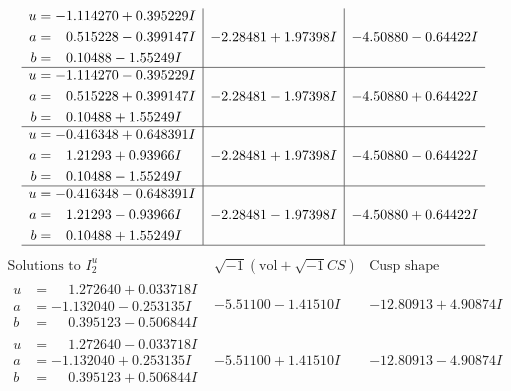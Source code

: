 \documentclass[1p]{elsarticle_modified}
\theoremstyle{definition}
\newcommand{\I}{\sqrt{-1}}
\begin{document}
$$\begin{array}{c|c|c}
\begin{aligned}
u &= -1.114270 + 0.395229 I \\
a &= \phantom{-}0.515228 - 0.399147 I \\
b &= \phantom{-}0.10488 - 1.55249 I\end{aligned}
 & -2.28481 + 1.97398 I & -4.50880 - 0.64422 I \\ \hline\begin{aligned}
u &= -1.114270 - 0.395229 I \\
a &= \phantom{-}0.515228 + 0.399147 I \\
b &= \phantom{-}0.10488 + 1.55249 I\end{aligned}
 & -2.28481 - 1.97398 I & -4.50880 + 0.64422 I \\ \hline\begin{aligned}
u &= -0.416348 + 0.648391 I \\
a &= \phantom{-}1.21293 + 0.93966 I \\
b &= \phantom{-}0.10488 - 1.55249 I\end{aligned}
 & -2.28481 + 1.97398 I & -4.50880 - 0.64422 I \\ \hline\begin{aligned}
u &= -0.416348 - 0.648391 I \\
a &= \phantom{-}1.21293 - 0.93966 I \\
b &= \phantom{-}0.10488 + 1.55249 I\end{aligned}
 & -2.28481 - 1.97398 I & -4.50880 + 0.64422 I\\
 \hline 
 \end{array}$$\newpage$$\begin{array}{c|c|c}  
\text{Solutions to }I^u_{2}& \I (\text{vol} + \sqrt{-1}CS) & \text{Cusp shape}\\
 \hline 
\begin{aligned}
u &= \phantom{-}1.272640 + 0.033718 I \\
a &= -1.132040 - 0.253135 I \\
b &= \phantom{-}0.395123 - 0.506844 I\end{aligned}
 & -5.51100 - 1.41510 I & -12.80913 + 4.90874 I \\ \hline\begin{aligned}
u &= \phantom{-}1.272640 - 0.033718 I \\
a &= -1.132040 + 0.253135 I \\
b &= \phantom{-}0.395123 + 0.506844 I\end{aligned}
 & -5.51100 + 1.41510 I & -12.80913 - 4.90874 I \\ \hline\begin{aligned}

\end{aligned}
\end{array}$$
\end{document}
